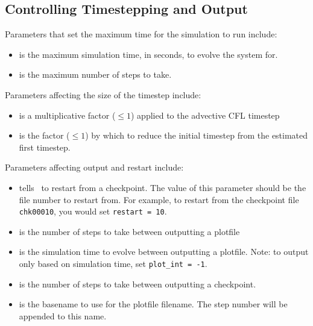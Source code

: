 \subsection{Controlling Timestepping and Output}

Parameters that set the maximum time for the simulation to run
include:
\begin{itemize}
\item {} is the maximum simulation time, in seconds,
      to evolve the system for.

\item {} is the maximum number of steps to take.
\end{itemize}

\noindent Parameters affecting the size of the timestep include:
\begin{itemize}
\item {} is a multiplicative factor ({\tt $\le 1$}) 
      applied to the advective CFL timestep

\item {} is the factor ({\tt $\le 1$}) by which to reduce 
      the initial timestep from the estimated first timestep.
\end{itemize}

\noindent Parameters affecting output and restart include:
\begin{itemize}

\item {} tells \maestro\ to restart from a checkpoint.  The
      value of this parameter should be the file number to restart from.
      For example, to restart from the checkpoint file {\tt chk00010},
      you would set {\tt restart = 10}.

\item {} is the number of steps to take between
  outputting a plotfile

\item {} is the simulation time to evolve between
  outputting a plotfile.  Note: to output only based on simulation
  time, set {\tt plot\_int = -1}.

\item {} is the number of steps to take between
  outputting a checkpoint.

\item {} is the basename to use for the
  plotfile filename.  The step number will be appended to
  this name.

\end{itemize}

